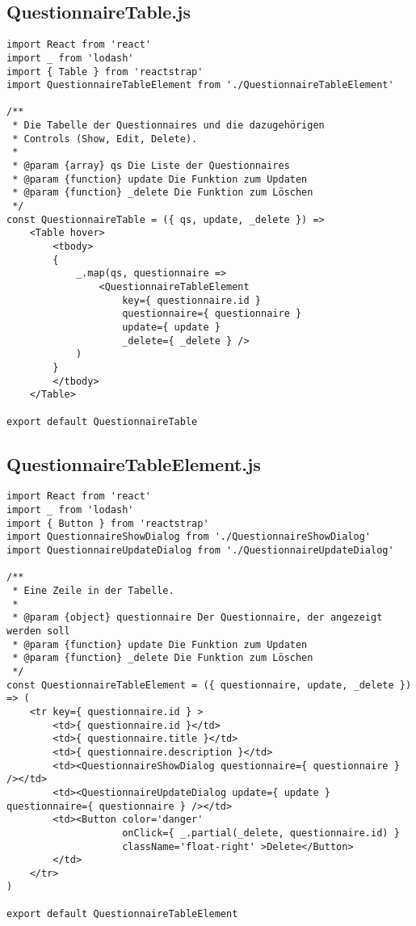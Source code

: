 \subsection{QuestionnaireTable.js}
\begin{verbatim}
import React from 'react'
import _ from 'lodash'
import { Table } from 'reactstrap'
import QuestionnaireTableElement from './QuestionnaireTableElement'

/**
 * Die Tabelle der Questionnaires und die dazugehörigen 
 * Controls (Show, Edit, Delete).
 * 
 * @param {array} qs Die Liste der Questionnaires
 * @param {function} update Die Funktion zum Updaten
 * @param {function} _delete Die Funktion zum Löschen
 */
const QuestionnaireTable = ({ qs, update, _delete }) => 
    <Table hover>
        <tbody>
        { 
            _.map(qs, questionnaire => 
                <QuestionnaireTableElement 
                    key={ questionnaire.id } 
                    questionnaire={ questionnaire }
                    update={ update }
                    _delete={ _delete } />
            ) 
        }
        </tbody>
    </Table>

export default QuestionnaireTable
\end{verbatim}

\subsection{QuestionnaireTableElement.js}
\begin{verbatim}
import React from 'react'
import _ from 'lodash'
import { Button } from 'reactstrap'
import QuestionnaireShowDialog from './QuestionnaireShowDialog'
import QuestionnaireUpdateDialog from './QuestionnaireUpdateDialog'

/**
 * Eine Zeile in der Tabelle.
 * 
 * @param {object} questionnaire Der Questionnaire, der angezeigt werden soll
 * @param {function} update Die Funktion zum Updaten
 * @param {function} _delete Die Funktion zum Löschen 
 */
const QuestionnaireTableElement = ({ questionnaire, update, _delete }) => (
    <tr key={ questionnaire.id } >
        <td>{ questionnaire.id }</td>
        <td>{ questionnaire.title }</td>
        <td>{ questionnaire.description }</td>
        <td><QuestionnaireShowDialog questionnaire={ questionnaire } /></td>
        <td><QuestionnaireUpdateDialog update={ update } questionnaire={ questionnaire } /></td>
        <td><Button color='danger' 
                    onClick={ _.partial(_delete, questionnaire.id) } 
                    className='float-right' >Delete</Button>
        </td>
    </tr>
)

export default QuestionnaireTableElement
\end{verbatim}

